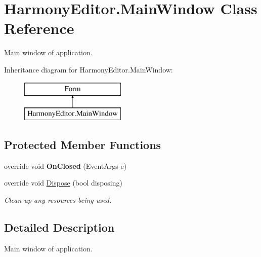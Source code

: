 \hypertarget{class_harmony_editor_1_1_main_window}{\section{Harmony\+Editor.\+Main\+Window Class Reference}
\label{class_harmony_editor_1_1_main_window}
}


Main window of application.  


Inheritance diagram for Harmony\+Editor.\+Main\+Window\+:\begin{figure}[H]
\begin{center}
\leavevmode
\includegraphics[height=2.000000cm]{class_harmony_editor_1_1_main_window}
\end{center}
\end{figure}
\subsection*{Protected Member Functions}
\begin{DoxyCompactItemize}
\item 
\hypertarget{class_harmony_editor_1_1_main_window_aa6f21116b893261c47e338a654bd1a25}{override void {\bfseries On\+Closed} (Event\+Args e)}\label{class_harmony_editor_1_1_main_window_aa6f21116b893261c47e338a654bd1a25}

\item 
override void \hyperlink{class_harmony_editor_1_1_main_window_a72a09ae6274e5b02720d28f5c12d7fa4}{Dispose} (bool disposing)
\begin{DoxyCompactList}\small\item\em Clean up any resources being used. \end{DoxyCompactList}\end{DoxyCompactItemize}


\subsection{Detailed Description}
Main window of application. 



